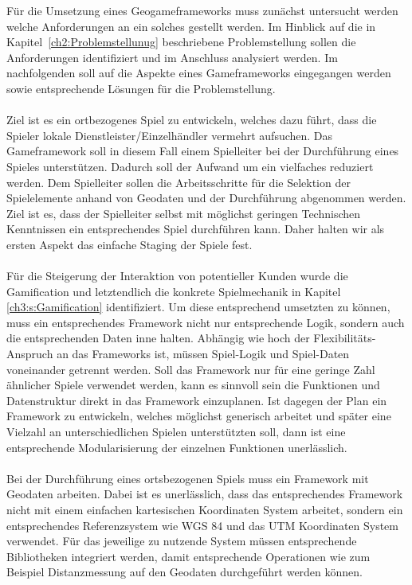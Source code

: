 Für die Umsetzung eines Geogameframeworks muss zunächst untersucht werden welche Anforderungen an ein solches gestellt werden.
Im Hinblick auf die in Kapitel~\ref{ch2:Problemstellunug} beschriebene Problemstellung sollen die Anforderungen  identifiziert und im Anschluss analysiert werden. Im nachfolgenden soll auf die Aspekte eines Gameframeworks eingegangen werden sowie entsprechende Lösungen für die Problemstellung.
\\\\
Ziel ist es ein ortbezogenes Spiel zu entwickeln, welches dazu führt, dass die Spieler lokale Dienstleister/Einzelhändler vermehrt aufsuchen. Das Gameframework soll in diesem Fall einem Spielleiter bei der Durchführung eines Spieles unterstützen. Dadurch soll der Aufwand um ein vielfaches reduziert werden.
Dem Spielleiter sollen die Arbeitsschritte für die Selektion der Spielelemente anhand von Geodaten und der Durchführung abgenommen werden. Ziel ist es, dass der Spielleiter selbst mit möglichst geringen Technischen Kenntnissen ein entsprechendes Spiel durchführen kann. Daher halten wir als ersten Aspekt das einfache Staging der Spiele fest.
\\\\
Für die Steigerung der Interaktion von potentieller Kunden wurde die Gamification und letztendlich die konkrete Spielmechanik in Kapitel \ref{ch3:s:Gamification} identifiziert. Um diese entsprechend umsetzten zu können, muss ein entsprechendes Framework nicht nur entsprechende Logik, sondern auch die entsprechenden Daten inne halten. Abhängig wie hoch der Flexibilitäts-Anspruch an das Frameworks ist, müssen Spiel-Logik und Spiel-Daten voneinander getrennt werden. Soll das Framework nur für eine geringe Zahl ähnlicher Spiele verwendet werden, kann es sinnvoll sein die Funktionen und Datenstruktur direkt in das Framework einzuplanen. Ist dagegen der Plan ein Framework zu entwickeln, welches möglichst generisch arbeitet und später eine Vielzahl an unterschiedlichen Spielen unterstützten soll, dann ist eine entsprechende Modularisierung der einzelnen Funktionen unerlässlich.
\\\\
Bei der Durchführung eines ortsbezogenen Spiels muss ein Framework mit Geodaten arbeiten.
Dabei ist es unerlässlich, dass das entsprechendes Framework nicht mit einem einfachen kartesischen Koordinaten System arbeitet, sondern ein entsprechendes Referenzsystem wie WGS 84 \cite{Grafarend.1998} und das UTM Koordinaten System \cite{Grafarend.1995} verwendet.
Für das jeweilige zu nutzende System müssen entsprechende Bibliotheken integriert werden, damit entsprechende Operationen wie zum Beispiel Distanzmessung auf den Geodaten durchgeführt werden können.
